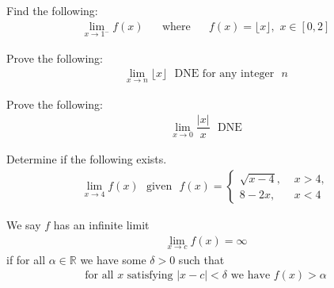 \begin{exercise}
Find the following: 
\begin{align*}
    \lim_{x \longrightarrow 1^{-}} f(x) \hspace{20pt} \text{where} \hspace{20pt} f(x) = \lfloor x \rfloor,  \hspace{4pt} x \in [0, 2]
\end{align*}
\end{exercise}

\begin{exercise}
Prove the following:
\begin{align*}
    \lim_{x \longrightarrow n} \lfloor x \rfloor \hspace{8pt} \text{DNE for any integer} \hspace{8pt} n 
\end{align*}
\end{exercise}

\begin{exercise}
Prove the following:
\begin{align*}
    \lim_{x \longrightarrow 0} \dfrac{\lvert x \rvert}{x} \hspace{8pt} \text{DNE}
\end{align*}
\end{exercise}

\begin{exercise}
Determine if the following exists.
\begin{align*}
    \lim_{x \longrightarrow 4} f(x) \hspace{8pt} \text{given} \hspace{8pt} f(x) = 
    \begin{cases}
    \sqrt{x-4}, \hspace{4pt} &x > 4,\\[2ex]
    8-2x, \hspace{4pt} &x < 4
    \end{cases}
\end{align*}
\end{exercise}

\begin{definition}
We say $f$ has an infinite limit 
\begin{align*}
    \lim_{x \longrightarrow c} f(x) = \infty
\end{align*}
if for all $\alpha \in \mathbb{R}$ we have some $\delta > 0$ such that
\begin{align*}
    \text{for all} \hspace{4pt} x \hspace{4pt} \text{satisfying} \hspace{4pt} \lvert x - c \rvert < \delta \hspace{4pt} \text{we have} \hspace{4pt} f(x) > \alpha
\end{align*}
\end{definition}

